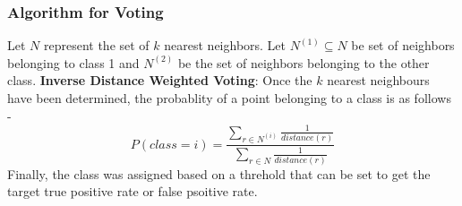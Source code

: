 \subsubsection{Algorithm for Voting}
 	 	Let $N$ represent the set of $k$ nearest neighbors. Let $N^(1)\subseteq N$ be set of neighbors belonging to class 1 and $N^(2)$ be the set of neighbors belonging to the other class.
\textbf{Inverse Distance Weighted Voting}: Once the $k$ nearest neighbours have been determined, the probablity of a point belonging to a class is as follows - 
\begin{equation*}
	P(class = i) = \frac{\sum_{r \in N^(i)} \frac{1}{distance(r)}}{\sum_{r \in N} \frac{1}{distance(r)}}
\end{equation*}
Finally, the class was assigned based on a threhold that can be set to get the target true positive rate or false psoitive rate.

